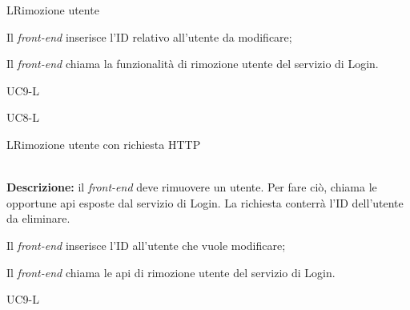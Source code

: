 \begin{usecase}{7}{L}{Rimozione utente}



	\begin{ucscenarioprincipale}
		\item Il \textit{front-end} inserisce l'ID relativo all'utente da modificare;
		\item Il \textit{front-end} chiama la funzionalità di rimozione utente del servizio di Login.
	\end{ucscenarioprincipale}


	\begin{ucestensioni}
		\item UC9-L
	\end{ucestensioni}

	\begin{ucgeneralizzazioni}
		\item UC8-L
	\end{ucgeneralizzazioni}

	\label{uc:rimozione-utente-l}
\end{usecase}

\begin{usecase}{8}{L}{Rimozione utente con richiesta HTTP}


	\textbf{\\Descrizione:} il \textit{front-end} deve rimuovere un utente. Per fare ciò,
	chiama le opportune \acrshort{api} esposte dal servizio di Login. La richiesta conterrà l'ID dell'utente da eliminare.

	\begin{ucscenarioprincipale}
		\item Il \textit{front-end} inserisce l'ID all'utente che vuole modificare;
		\item Il \textit{front-end} chiama le \acrshort{api} di rimozione utente del servizio di Login.
	\end{ucscenarioprincipale}


	\begin{ucestensioni}
		\item UC9-L
	\end{ucestensioni}

	\label{uc:richiesta-rimozione-utente-l}
\end{usecase}

